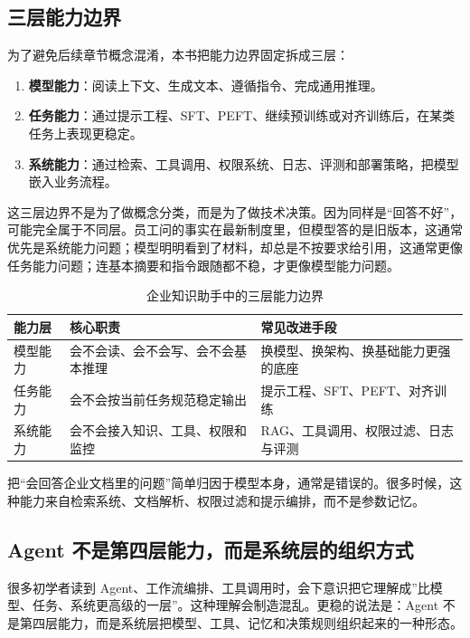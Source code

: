 \subsection{三层能力边界}
为了避免后续章节概念混淆，本书把能力边界固定拆成三层：
\begin{enumerate}
  \item \textbf{模型能力}：阅读上下文、生成文本、遵循指令、完成通用推理。
  \item \textbf{任务能力}：通过提示工程、SFT、PEFT、继续预训练或对齐训练后，在某类任务上表现更稳定。
  \item \textbf{系统能力}：通过检索、工具调用、权限系统、日志、评测和部署策略，把模型嵌入业务流程。
\end{enumerate}

这三层边界不是为了做概念分类，而是为了做技术决策。因为同样是“回答不好”，可能完全属于不同层。员工问的事实在最新制度里，但模型答的是旧版本，这通常优先是系统能力问题；模型明明看到了材料，却总是不按要求给引用，这通常更像任务能力问题；连基本摘要和指令跟随都不稳，才更像模型能力问题。

\begin{table}[H]
\centering
\small
\begin{tabularx}{\textwidth}{>{\raggedright\arraybackslash}p{2.8cm}>{\raggedright\arraybackslash}p{3cm}>{\raggedright\arraybackslash}X}
\toprule
\textbf{能力层} & \textbf{核心职责} & \textbf{常见改进手段} \\
\midrule
模型能力 & 会不会读、会不会写、会不会基本推理 & 换模型、换架构、换基础能力更强的底座 \\
任务能力 & 会不会按当前任务规范稳定输出 & 提示工程、SFT、PEFT、对齐训练 \\
系统能力 & 会不会接入知识、工具、权限和监控 & RAG、工具调用、权限过滤、日志与评测 \\
\bottomrule
\end{tabularx}
\caption{企业知识助手中的三层能力边界}
\label{tab:llm-three-layers}
\end{table}

\begin{note}
把“会回答企业文档里的问题”简单归因于模型本身，通常是错误的。很多时候，这种能力来自检索系统、文档解析、权限过滤和提示编排，而不是参数记忆。
\end{note}

\subsection{Agent 不是第四层能力，而是系统层的组织方式}
很多初学者读到 Agent、工作流编排、工具调用时，会下意识把它理解成”比模型、任务、系统更高级的一层”。这种理解会制造混乱。更稳的说法是：Agent 不是第四层能力，而是系统层把模型、工具、记忆和决策规则组织起来的一种形态。

